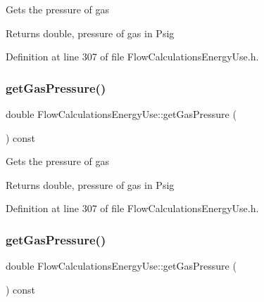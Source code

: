 Gets the pressure of gas

\begin{DoxyReturn}{Returns}
double, pressure of gas in Psig 
\end{DoxyReturn}


Definition at line 307 of file Flow\+Calculations\+Energy\+Use.\+h.

\mbox{\label{class_flow_calculations_energy_use_af98e97bce88915e6fdd7a0caf837049c}} 
\subsubsection{\texorpdfstring{get\+Gas\+Pressure()}{getGasPressure()}\hspace{0.1cm}{\footnotesize\ttfamily [2/3]}}
{\footnotesize\ttfamily double Flow\+Calculations\+Energy\+Use\+::get\+Gas\+Pressure (\begin{DoxyParamCaption}{ }\end{DoxyParamCaption}) const\hspace{0.3cm}{\ttfamily [inline]}}

Gets the pressure of gas

\begin{DoxyReturn}{Returns}
double, pressure of gas in Psig 
\end{DoxyReturn}


Definition at line 307 of file Flow\+Calculations\+Energy\+Use.\+h.

\mbox{\label{class_flow_calculations_energy_use_af98e97bce88915e6fdd7a0caf837049c}} 
\subsubsection{\texorpdfstring{get\+Gas\+Pressure()}{getGasPressure()}\hspace{0.1cm}{\footnotesize\ttfamily [3/3]}}
{\footnotesize\ttfamily double Flow\+Calculations\+Energy\+Use\+::get\+Gas\+Pressure (\begin{DoxyParamCaption}{ }\end{DoxyParamCaption}) const\hspace{0.3cm}{\ttfamily [inline]}}

